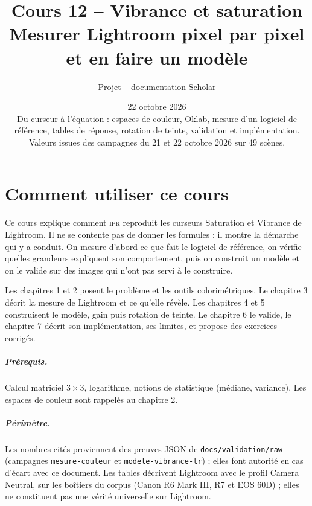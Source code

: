 \documentclass[12pt,a4paper,oneside]{report}
\title{Cours 12 -- Vibrance et saturation\\
\large Mesurer Lightroom pixel par pixel et en faire un modèle}
\author{Projet \IPR{} -- documentation Scholar}
\date{22 octobre 2026\\[3em]
\small Du curseur à l'équation : espaces de couleur, Oklab, mesure d'un logiciel de
référence, tables de réponse, rotation de teinte, validation et implémentation.\\
Valeurs issues des campagnes du 21 et 22 octobre 2026 sur 49 scènes.}
\newcommand{\IPR}{\textsc{ipr}}
\begin{document}
\maketitle
\tableofcontents

\chapter*{Comment utiliser ce cours}
Ce cours explique comment \IPR{} reproduit les curseurs Saturation et
Vibrance de Lightroom. Il ne se contente pas de donner les formules : il
montre la démarche qui y a conduit. On mesure d'abord ce que fait le logiciel
de référence, on vérifie quelles grandeurs expliquent son comportement, puis
on construit un modèle et on le valide sur des images qui n'ont pas servi à
le construire.

Les chapitres 1 et 2 posent le problème et les outils colorimétriques. Le
chapitre 3 décrit la mesure de Lightroom et ce qu'elle révèle. Les
chapitres 4 et 5 construisent le modèle, gain puis rotation de teinte. Le
chapitre 6 le valide, le chapitre 7 décrit son implémentation, ses limites,
et propose des exercices corrigés.

\paragraph{Prérequis.} Calcul matriciel $3\times3$, logarithme, notions de
statistique (médiane, variance). Les espaces de couleur sont rappelés au
chapitre 2.

\paragraph{Périmètre.} Les nombres cités proviennent des preuves JSON de
\texttt{docs/validation/raw} (campagnes \texttt{mesure-couleur} et
\texttt{modele-vibrance-lr}) ; elles font autorité en cas d'écart avec ce
document. Les tables décrivent Lightroom avec le profil Camera Neutral, sur les
boîtiers du corpus (Canon R6 Mark III, R7 et EOS 60D) ; elles ne constituent
pas une vérité universelle sur Lightroom.











\end{document}
